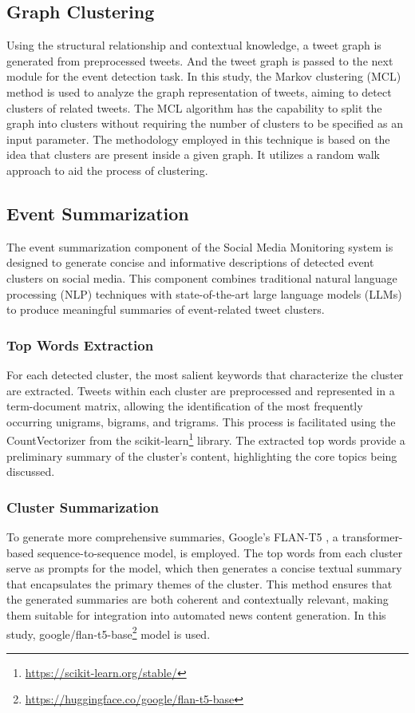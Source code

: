 \subsection{Graph Clustering}
\label{sec:graphclustering}
Using the structural relationship and contextual knowledge, a tweet graph is generated from preprocessed tweets. And the tweet graph is passed to the next module for the event detection task. In this study, the Markov clustering (MCL) method \cite{mcl} is used to analyze the graph representation of tweets, aiming to detect clusters of related tweets. The MCL algorithm has the capability to split the graph into clusters without requiring the number of clusters to be specified as an input parameter. The methodology employed in this technique is based on the idea that clusters are present inside a given graph. It utilizes a random walk approach to aid the process of clustering.



\subsection{Event Summarization}
\label{sec:eventsummarization}
The event summarization component of the Social Media Monitoring system is designed to generate concise and informative descriptions of detected event clusters on social media. This component combines traditional natural language processing (NLP) techniques with state-of-the-art large language models (LLMs) to produce meaningful summaries of event-related tweet clusters.

\subsubsection{Top Words Extraction} For each detected cluster, the most salient keywords that characterize the cluster are extracted. Tweets within each cluster are preprocessed and represented in a term-document matrix, allowing the identification of the most frequently occurring unigrams, bigrams, and trigrams. This process is facilitated using the CountVectorizer from the scikit-learn\footnote{\url{https://scikit-learn.org/stable/}} library. The extracted top words provide a preliminary summary of the cluster's content, highlighting the core topics being discussed.

\subsubsection{Cluster Summarization} To generate more comprehensive summaries, Google's FLAN-T5 \cite{google-flan-t5}, a transformer-based sequence-to-sequence model, is employed. The top words from each cluster serve as prompts for the model, which then generates a concise textual summary that encapsulates the primary themes of the cluster. This method ensures that the generated summaries are both coherent and contextually relevant, making them suitable for integration into automated news content generation. In this study, google/flan-t5-base\footnote{\url{https://huggingface.co/google/flan-t5-base}} model is used.

